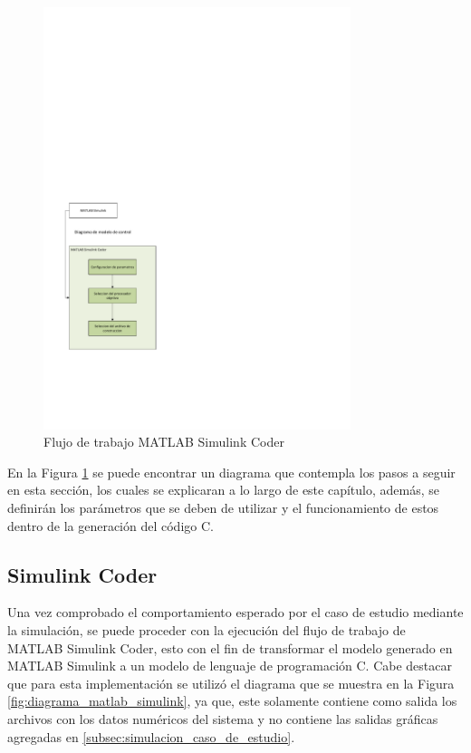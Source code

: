 \begin{figure}[h!]
    \centering
    \includegraphics[width=0.8\textwidth]{fig/especifico_2/M2MT/model_2_model_diagram.pdf}
    \caption{Flujo de trabajo MATLAB Simulink Coder}
    \label{fig:m2m_matlab_simulink_coder}
\end{figure}

En la Figura \ref{fig:m2m_matlab_simulink_coder} se puede encontrar un diagrama que contempla los pasos a seguir en esta sección, los cuales se explicaran a lo largo de este capítulo, además, se definirán los parámetros que se deben de utilizar y el funcionamiento de estos dentro de la generación del código C.

\subsection{Simulink Coder}\label{subsec:simulink_coder}

Una vez comprobado el comportamiento esperado por el caso de estudio mediante la simulación, se puede proceder con la ejecución del flujo de trabajo de MATLAB Simulink Coder, esto con el fin de transformar el modelo generado en MATLAB Simulink a un modelo de lenguaje de programación C. Cabe destacar que para esta implementación se utilizó el diagrama que se muestra en la Figura \ref{fig:diagrama_matlab_simulink}, ya que, este solamente contiene como salida los archivos con los datos numéricos del sistema y no contiene las salidas gráficas agregadas en \ref{subsec:simulacion_caso_de_estudio}.


